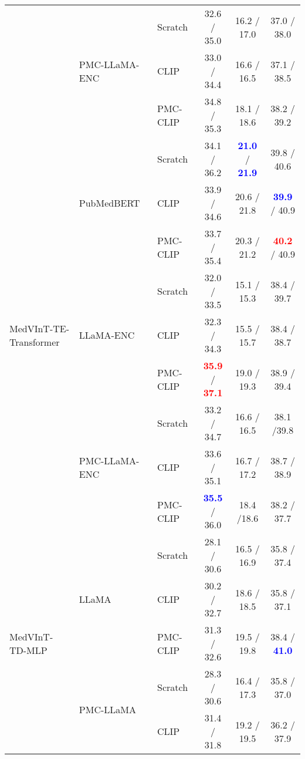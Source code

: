\documentclass{article}
\begin{document}
\begin{table}[htb]
\begin{tabular}{l|l|l|cc|c}
 & \multirow{3}{*}{PMC-LLaMA-ENC~\cite{wu2023pmcllama}}      & Scratch  & 32.6 / 35.0 & 16.2 / 17.0 & 37.0 / 38.0 \\
 & & CLIP~\cite{radford2021learning}     & 33.0 / 34.4  & 16.6 / 16.5 & 37.1 / 38.5 \\
 & & PMC-CLIP~\cite{lin2023pmcclip}  & 34.8  / 35.3 & 18.1 / 18.6 & {38.2} / 39.2 \\ \midrule
 \multirow{9}{*}{MedVInT-TE-Transformer} & \multirow{3}{*}{PubMedBERT~\cite{gu2021domain}} & Scratch  & 34.1 / 36.2 & \textcolor{blue}{\bf 21.0} / \textcolor{blue}{\bf 21.9} &  39.8 / 40.6\\
 & & CLIP~\cite{radford2021learning}    & 33.9 / 34.6  & 20.6 / 21.8 & \textcolor{blue}{\bf 39.9} / 40.9   \\
 & & PMC-CLIP~\cite{lin2023pmcclip}  & 33.7 / 35.4 &  20.3 / 21.2 & \textcolor{red}{\bf 40.2} / 40.9   \\ \cmidrule{2-6} 
 & \multirow{3}{*}{LLaMA-ENC~\cite{touvron2023llama}} & Scratch  &  32.0 / 33.5 & 15.1 / 15.3 & 38.4 / 39.7 \\
 & & CLIP~\cite{radford2021learning}     & 32.3 / 34.3  & 15.5 / 15.7 & 38.4 / 38.7  \\
 & & PMC-CLIP~\cite{lin2023pmcclip}  & \textcolor{red}{\bf 35.9} / \textcolor{red}{\bf 37.1} & 19.0 / 19.3 & 38.9 / 39.4 \\ \cmidrule{2-6} 
 & \multirow{3}{*}{PMC-LLaMA-ENC~\cite{wu2023pmcllama}}   & Scratch & 33.2 / 34.7 & 16.6 / 16.5 & 38.1 /39.8 \\
 & & CLIP~\cite{radford2021learning}     & 33.6 / 35.1 & 16.7 / 17.2 & 38.7 / 38.9 \\
 & & PMC-CLIP~\cite{lin2023pmcclip}  & \textcolor{blue}{\bf 35.5} / 36.0 & 18.4 /18.6 & 38.2 / 37.7 \\ 
 \midrule
\multirow{6}{*}{MedVInT-TD-MLP}     & \multirow{3}{*}{LLaMA\cite{touvron2023llama}} & Scratch  &  28.1 / 30.6 & 16.5 / 16.9 & 35.8 / 37.4 \\
 & & CLIP~\cite{radford2021learning}     &  30.2 / 32.7  & 18.6 / 18.5 & 35.8 / 37.1  \\
 & & PMC-CLIP~\cite{lin2023pmcclip}  &    31.3 / 32.6 &  19.5 / 19.8 &  38.4 / \textcolor{blue}{\bf 41.0}  \\ \cmidrule{2-6}
 & \multirow{3}{*}{PMC-LLaMA~\cite{wu2023pmcllama}}      & Scratch  &   28.3 / 30.6 & 16.4 / 17.3  & 35.8 / 37.0 \\
 & & CLIP~\cite{radford2021learning}     &   31.4 / 31.8 & 19.2 / 19.5 & 36.2 / 37.9\\

\end{tabular}
\end{table}
\end{document}
